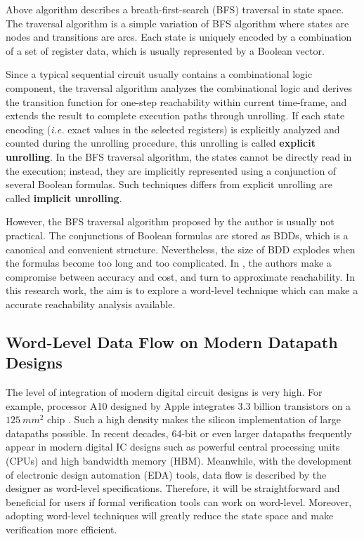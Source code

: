Above algorithm describes a breath-first-search (BFS) traversal in
state space. The traversal algorithm is a simple variation of BFS algorithm where 
states are nodes and transitions are arcs. Each state is uniquely encoded by a combination
of a set of register data, which is usually represented by a Boolean vector. 

Since a typical sequential circuit usually contains a combinational logic
component, the traversal algorithm analyzes the combinational logic and derives the transition 
function for one-step reachability within current time-frame, and extends the result to complete 
execution paths through unrolling. If each state encoding ({\it i.e.} exact values in the selected registers) is
explicitly analyzed and counted during the unrolling 
procedure, this unrolling is called {\bf explicit unrolling}. In the BFS traversal algorithm, the states cannot be 
directly read in the execution; instead, they are implicitly represented using a conjunction of several 
Boolean formulas. Such techniques differs from explicit unrolling are called {\bf implicit unrolling}.

However, the BFS traversal algorithm proposed by the author is usually not practical. The conjunctions of 
Boolean formulas are stored as BDDs, which is a canonical and convenient structure. Nevertheless, 
the size of BDD explodes when the formulas become too long and too complicated. In \cite{cho1993redundancy},
the authors make a compromise between accuracy and cost, and turn to approximate reachability. 
In this research work, the aim is to explore a word-level technique which can make a accurate reachability
analysis available.

\subsection{Word-Level Data Flow on Modern Datapath Designs}
The level of integration of modern digital circuit designs is very high. For example, processor A10 designed by Apple
integrates 3.3 billion transistors on a $125~mm^2$ chip \cite{AppleA10}. Such a high density makes the silicon 
implementation of large datapaths possible. In recent decades, 64-bit or even larger datapaths frequently appear in 
modern digital IC designs such as powerful central processing units (CPUs) and high bandwidth memory (HBM).
Meanwhile, with the development of electronic design automation (EDA) tools, data flow 
is described by the designer as word-level specifications. Therefore, it will be straightforward 
and beneficial for users if formal verification tools can work on word-level. Moreover, adopting word-level 
techniques will greatly reduce the state space and make verification more efficient.

